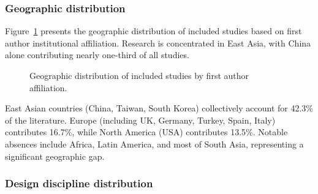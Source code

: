 \documentclass[ed]{acnsart}
\begin{document}
\subsubsection{Geographic distribution}

Figure~\ref{fig:geography} presents the geographic distribution of included studies based on first author institutional affiliation. Research is concentrated in East Asia, with China alone contributing nearly one-third of all studies.

\begin{figure}[htbp]
\centering
{}
\caption{Geographic distribution of included studies by first author affiliation.}
\label{fig:geography}
\end{figure}

East Asian countries (China, Taiwan, South Korea) collectively account for 42.3\% of the literature. Europe (including UK, Germany, Turkey, Spain, Italy) contributes 16.7\%, while North America (USA) contributes 13.5\%. Notable absences include Africa, Latin America, and most of South Asia, representing a significant geographic gap.

\subsubsection{Design discipline distribution}
\end{document}
